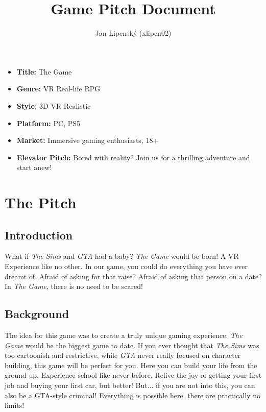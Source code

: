 \documentclass[a4paper,10pt,english]{article}
\title{%
Game Pitch Document%
}
\author{%
Jan Lipenský (xlipen02)%
}
\date{}
\begin{document}
\maketitle
\thispagestyle{empty}

{%
\large

\begin{itemize}

\item[] \textbf{Title:} The Game

\item[] \textbf{Genre:} VR Real-life RPG

\item[] \textbf{Style:} 3D VR Realistic

\item[] \textbf{Platform:} PC, PS5

\item[] \textbf{Market:} Immersive gaming enthusiasts, 18+

\item[] \textbf{Elevator Pitch:} Bored with reality? Join us for a thrilling adventure and start anew!

\end{itemize}

}

\section*{\centering The Pitch}


\subsection*{Introduction}
What if \emph{The Sims} and \emph{GTA} had a baby? \emph{The Game} would be born! A VR Experience like no other. In our game, you could do everything you have ever dreamt of. Afraid of asking for that raise? Afraid of asking that person on a date? In \emph{The Game}, there is no need to be scared! 


\subsection*{Background}
The idea for this game was to create a truly unique gaming experience. \emph{The Game} would be the biggest game to date. If you ever thought that \emph{The Sims} was too cartoonish and restrictive, while \emph{GTA} never really focused on character building, this game will be perfect for you. Here you can build your life from the ground up. Experience school like never before. Relive the joy of getting your first job and buying your first car, but better! But... if you are not into this, you can also be a GTA-style criminal! Everything is possible here, there are practically no limits!
\end{document}
